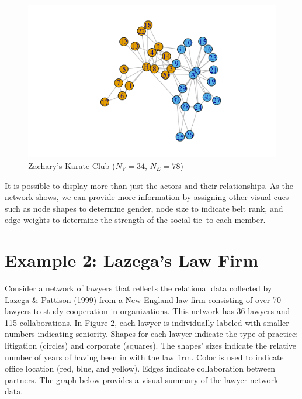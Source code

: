 \documentclass[12pt,twoside]{amherstthesis}
\begin{document}
  \begin{figure}[htbp]
  \centering
  \includegraphics{figure/01karateplot.png}
  \caption{Zachary's Karate Club (\(N_V = 34\), \(N_E = 78\))}
  \end{figure}
  
  It is possible to display more than just the actors and their
  relationships. As the network shows, we can provide more information by
  assigning other visual cues--such as node shapes to determine gender,
  node size to indicate belt rank, and edge weights to determine the
  strength of the social tie--to each member.
  
  \section{Example 2: Lazega's Law Firm}\label{example-2-lazegas-law-firm}
  
  Consider a network of lawyers that reflects the relational data
  collected by Lazega \& Pattison (1999) from a New England law firm
  consisting of over 70 lawyers to study cooperation in organizations.
  This network has 36 lawyers and 115 collaborations. In Figure 2, each
  lawyer is individually labeled with smaller numbers indicating
  seniority. Shapes for each lawyer indicate the type of practice:
  litigation (circles) and corporate (squares). The shapes' sizes indicate
  the relative number of years of having been in with the law firm. Color
  is used to indicate office location (red, blue, and yellow). Edges
  indicate collaboration between partners. The graph below provides a
  visual summary of the lawyer network data.
  
\end{document}
